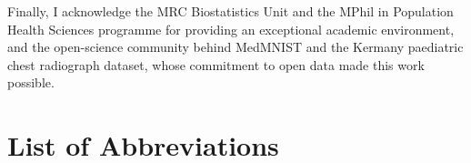 \documentclass[12pt, a4paper, twoside, openright]{book}
\begin{document}
Finally, I acknowledge the MRC Biostatistics Unit and the MPhil in Population Health Sciences programme for providing an exceptional academic environment, and the open-science community behind MedMNIST and the Kermany paediatric chest radiograph dataset, whose commitment to open data made this work possible.

\newpage

\tableofcontents
\newpage
\listoffigures
{}
\newpage
\listoftables
{}
\newpage

\chapter*{List of Abbreviations}
\end{document}

